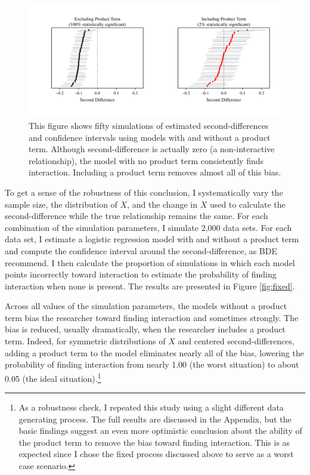 \documentclass[12pt]{article}
\begin{document}
\begin{figure}[h]
\begin{center}
\includegraphics[scale=.7]{fig/fig-plotted-cis.pdf}
\end{center}
\caption{This figure shows fifty simulations of estimated second-differences and confidence intervals using models with and without a product term. Although second-difference is actually zero (a non-interactive relationship), the model with no product term consistently finds interaction. Including a product term removes almost all of this bias.}\label{fig:plotted-cis}
\end{figure}

To get a sense of the robustness of this conclusion, I systematically vary the sample size, the distribution of $X$, and the change in $X$ used to calculate the second-difference while the true relationship remains the same. For each combination of the simulation parameters, I simulate 2,000 data sets. For each data set, I estimate a logistic regression model with and without a product term and compute the confidence interval around the second-difference, as BDE recommend. I then calculate the proportion of simulations in which each model points incorrectly toward interaction to estimate the probability of finding interaction when none is present. The results are presented in Figure \ref{fig:fixed}.

Across all values of the simulation parameters, the models without a product term bias the researcher toward finding interaction and sometimes strongly. The bias is reduced, usually dramatically, when the researcher includes a product term. Indeed, for symmetric distributions of $X$ and centered second-differences, adding a product term to the model eliminates nearly all of the bias, lowering the probability of finding interaction
from nearly 1.00 (the worst  situation) to about 0.05 (the ideal situation).\footnote{As a robustness check, I repeated this study using a slight different data generating process. The full results are discussed in the Appendix, but the basic findings suggest an even more optimistic conclusion about the ability of the product term to remove the bias toward finding interaction. This is as expected since I chose the fixed process discussed above to serve as a worst case scenario.}
\end{document}
